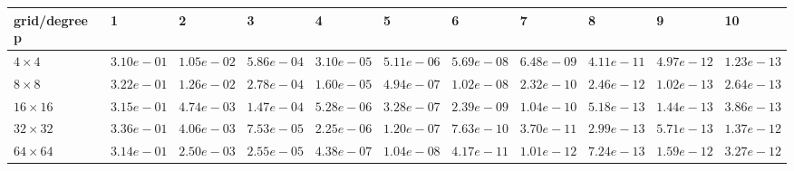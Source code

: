 \begin{tabular}{lllllllllll}
\hline
 grid/degree p   & 1          & 2          & 3          & 4          & 5          & 6          & 7          & 8          & 9          & 10         \\
\hline
 $4 \times 4$    & $3.10e-01$ & $1.05e-02$ & $5.86e-04$ & $3.10e-05$ & $5.11e-06$ & $5.69e-08$ & $6.48e-09$ & $4.11e-11$ & $4.97e-12$ & $1.23e-13$ \\
 $8 \times 8$    & $3.22e-01$ & $1.26e-02$ & $2.78e-04$ & $1.60e-05$ & $4.94e-07$ & $1.02e-08$ & $2.32e-10$ & $2.46e-12$ & $1.02e-13$ & $2.64e-13$ \\
 $16 \times 16$  & $3.15e-01$ & $4.74e-03$ & $1.47e-04$ & $5.28e-06$ & $3.28e-07$ & $2.39e-09$ & $1.04e-10$ & $5.18e-13$ & $1.44e-13$ & $3.86e-13$ \\
 $32 \times 32$  & $3.36e-01$ & $4.06e-03$ & $7.53e-05$ & $2.25e-06$ & $1.20e-07$ & $7.63e-10$ & $3.70e-11$ & $2.99e-13$ & $5.71e-13$ & $1.37e-12$ \\
 $64 \times 64$  & $3.14e-01$ & $2.50e-03$ & $2.55e-05$ & $4.38e-07$ & $1.04e-08$ & $4.17e-11$ & $1.01e-12$ & $7.24e-13$ & $1.59e-12$ & $3.27e-12$ \\
\hline
\end{tabular}
